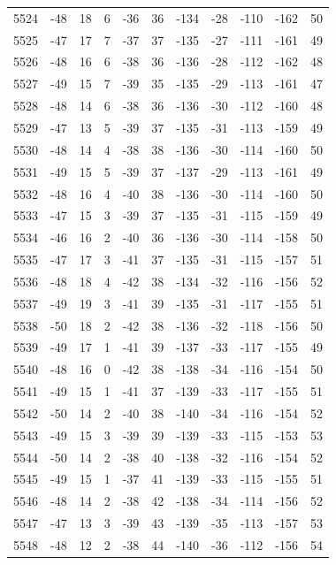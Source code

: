 \begin{table}[H]
\begin{tabular}{lllllllllll}
5524 & -48 & 18 & 6 & -36 & 36 & -134 & -28 & -110 & -162 & 50 \\
5525 & -47 & 17 & 7 & -37 & 37 & -135 & -27 & -111 & -161 & 49 \\
5526 & -48 & 16 & 6 & -38 & 36 & -136 & -28 & -112 & -162 & 48 \\
5527 & -49 & 15 & 7 & -39 & 35 & -135 & -29 & -113 & -161 & 47 \\
5528 & -48 & 14 & 6 & -38 & 36 & -136 & -30 & -112 & -160 & 48 \\
5529 & -47 & 13 & 5 & -39 & 37 & -135 & -31 & -113 & -159 & 49 \\
5530 & -48 & 14 & 4 & -38 & 38 & -136 & -30 & -114 & -160 & 50 \\
5531 & -49 & 15 & 5 & -39 & 37 & -137 & -29 & -113 & -161 & 49 \\
5532 & -48 & 16 & 4 & -40 & 38 & -136 & -30 & -114 & -160 & 50 \\
5533 & -47 & 15 & 3 & -39 & 37 & -135 & -31 & -115 & -159 & 49 \\
5534 & -46 & 16 & 2 & -40 & 36 & -136 & -30 & -114 & -158 & 50 \\
5535 & -47 & 17 & 3 & -41 & 37 & -135 & -31 & -115 & -157 & 51 \\
5536 & -48 & 18 & 4 & -42 & 38 & -134 & -32 & -116 & -156 & 52 \\
5537 & -49 & 19 & 3 & -41 & 39 & -135 & -31 & -117 & -155 & 51 \\
5538 & -50 & 18 & 2 & -42 & 38 & -136 & -32 & -118 & -156 & 50 \\
5539 & -49 & 17 & 1 & -41 & 39 & -137 & -33 & -117 & -155 & 49 \\
5540 & -48 & 16 & 0 & -42 & 38 & -138 & -34 & -116 & -154 & 50 \\
5541 & -49 & 15 & 1 & -41 & 37 & -139 & -33 & -117 & -155 & 51 \\
5542 & -50 & 14 & 2 & -40 & 38 & -140 & -34 & -116 & -154 & 52 \\
5543 & -49 & 15 & 3 & -39 & 39 & -139 & -33 & -115 & -153 & 53 \\
5544 & -50 & 14 & 2 & -38 & 40 & -138 & -32 & -116 & -154 & 52 \\
5545 & -49 & 15 & 1 & -37 & 41 & -139 & -33 & -115 & -155 & 51 \\
5546 & -48 & 14 & 2 & -38 & 42 & -138 & -34 & -114 & -156 & 52 \\
5547 & -47 & 13 & 3 & -39 & 43 & -139 & -35 & -113 & -157 & 53 \\
5548 & -48 & 12 & 2 & -38 & 44 & -140 & -36 & -112 & -156 & 54 \\

\end{tabular}
\end{table}
